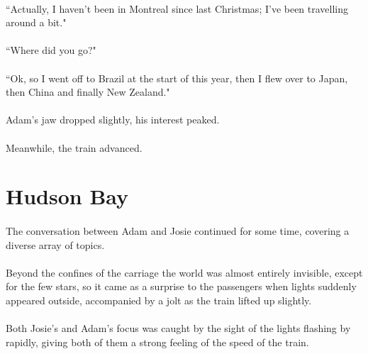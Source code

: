 \documentclass{article}
\begin{document}
\paragraph{}
``Actually, I haven't been in Montreal since last Christmas; I've been travelling around a bit."

\paragraph{}
``Where did you go?"

\paragraph{}
``Ok, so I went off to Brazil at the start of this year, then I flew over to Japan, then China and finally New Zealand."

\paragraph{}
Adam's jaw dropped slightly, his interest peaked.

\paragraph{}
Meanwhile, the train advanced.

\section{Hudson Bay}

\paragraph{}
The conversation between Adam and Josie continued for some time, covering a diverse array of topics.

\paragraph{}
Beyond the confines of the carriage the world was almost entirely invisible, except for the few stars, so it came as a surprise to the passengers when lights suddenly appeared outside, accompanied by a jolt as the train lifted up slightly.

\paragraph{}
Both Josie's and Adam's focus was caught by the sight of the lights flashing by rapidly, giving both of them a strong feeling of the speed of the train.
\end{document}
